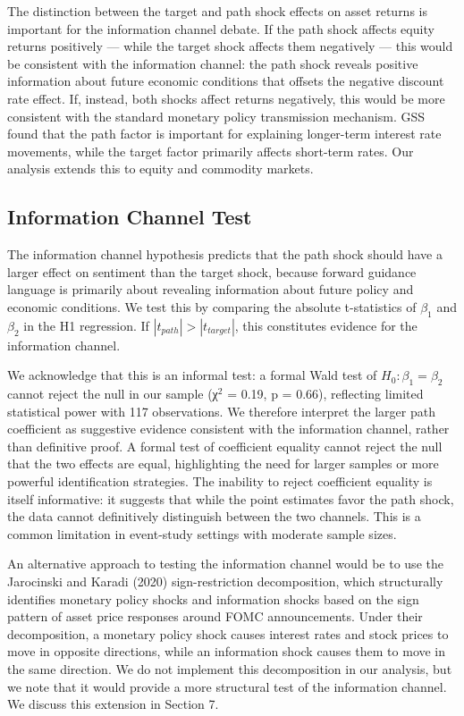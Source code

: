 \documentclass[12pt]{article}
\begin{document}
The distinction between the target and path shock effects on asset returns is important for the information channel debate. If the path shock affects equity returns positively --- while the target shock affects them negatively --- this would be consistent with the information channel: the path shock reveals positive information about future economic conditions that offsets the negative discount rate effect. If, instead, both shocks affect returns negatively, this would be more consistent with the standard monetary policy transmission mechanism. GSS found that the path factor is important for explaining longer-term interest rate movements, while the target factor primarily affects short-term rates. Our analysis extends this to equity and commodity markets.

\subsection{Information Channel Test}

The information channel hypothesis predicts that the path shock should have a larger effect on sentiment than the target shock, because forward guidance language is primarily about revealing information about future policy and economic conditions. We test this by comparing the absolute t-statistics of $\beta_1$ and $\beta_2$ in the H1 regression. If $|t_{path}| > |t_{target}|$, this constitutes evidence for the information channel.

We acknowledge that this is an informal test: a formal Wald test of $H_0: \beta_1 = \beta_2$ cannot reject the null in our sample (χ$^2$ = 0.19, p = 0.66), reflecting limited statistical power with 117 observations. We therefore interpret the larger path coefficient as suggestive evidence consistent with the information channel, rather than definitive proof. A formal test of coefficient equality cannot reject the null that the two effects are equal, highlighting the need for larger samples or more powerful identification strategies. The inability to reject coefficient equality is itself informative: it suggests that while the point estimates favor the path shock, the data cannot definitively distinguish between the two channels. This is a common limitation in event-study settings with moderate sample sizes.

An alternative approach to testing the information channel would be to use the Jarocinski and Karadi (2020) sign-restriction decomposition, which structurally identifies monetary policy shocks and information shocks based on the sign pattern of asset price responses around FOMC announcements. Under their decomposition, a monetary policy shock causes interest rates and stock prices to move in opposite directions, while an information shock causes them to move in the same direction. We do not implement this decomposition in our analysis, but we note that it would provide a more structural test of the information channel. We discuss this extension in Section 7.
\end{document}
